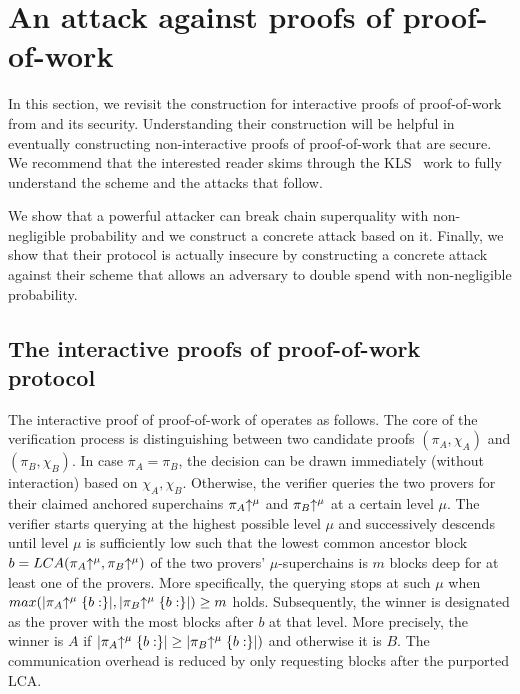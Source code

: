 \section{An attack against proofs of proof-of-work}

In this section, we revisit the construction for interactive proofs of
proof-of-work from \cite{KLS} and its security.  Understanding their
construction will be helpful in eventually constructing non-interactive proofs
of proof-of-work that are secure. We recommend that the interested reader skims
through the KLS~\cite{KLS} work to fully understand the scheme and the 
attacks that follow.

We show that a powerful attacker can break chain superquality with
non-negligible probability and we construct a concrete attack based on it.
Finally, we show that their protocol is actually insecure by constructing a
concrete attack against their scheme that allows an adversary to double spend
with non-negligible probability.

\subsection{The interactive proofs of proof-of-work protocol}


The interactive proof of
proof-of-work of \cite{KLS} operates as follows.
The core of the verification process is distinguishing between
two candidate proofs $(\pi_A, \chi_A)$  and $(\pi_B, \chi_B)$.
In case  $\pi_A  = \pi_B$, the decision can be drawn immediately (without interaction) based
on $\chi_A,\chi_B$.
Otherwise, the verifier queries the two provers for their claimed
anchored superchains $\pi_A\negthickspace\uparrow^\mu$ and $\pi_B\negthickspace\uparrow^\mu$ at a
certain level $\mu$. The verifier starts querying at the highest possible level
$\mu$ and successively descends until level $\mu$ is sufficiently low such that
the lowest common ancestor block $b = LCA(\pi_A\negthickspace\uparrow^\mu,
\pi_B\negthickspace\uparrow^\mu)$ of the two provers' $\mu$-superchains is $m$ blocks deep
for at least one of the provers. More specifically, the querying stops at such
$\mu$ when $max(|\pi_A\negthickspace\uparrow^\mu\{b:\}|, |\pi_B\negthickspace\uparrow^\mu\{b:\}|) \geq
m$ holds. Subsequently, the winner is designated as the prover with the most
blocks after $b$ at that level. More precisely, the winner is $A$ if
$|\pi_A\negthickspace\uparrow^\mu\{b:\}| \geq |\pi_B\negthickspace\uparrow^\mu\{b:\}|)$ and otherwise it
is $B$. The communication overhead is  reduced by only requesting
blocks after the purported LCA.

